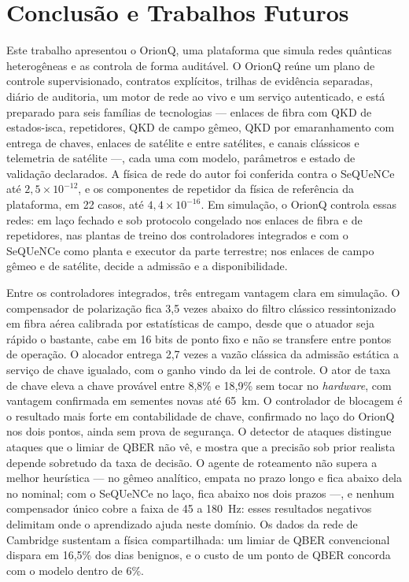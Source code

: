 \documentclass[12pt]{article}
\begin{document}
\section{Conclusão e Trabalhos Futuros}

Este trabalho apresentou o OrionQ, uma plataforma que simula redes quânticas
heterogêneas e as controla de forma auditável. O OrionQ reúne um plano de
controle supervisionado, contratos explícitos, trilhas de evidência separadas,
diário de auditoria, um motor de rede ao vivo e um serviço autenticado, e está
preparado para seis famílias de tecnologias --- enlaces de fibra com QKD de
estados-isca, repetidores, QKD de campo gêmeo, QKD por emaranhamento com entrega
de chaves, enlaces de satélite e entre satélites, e canais clássicos e telemetria
de satélite ---, cada uma com modelo, parâmetros e estado de validação
declarados. A física de rede do autor foi conferida contra o SeQUeNCe até
$2{,}5\times10^{-12}$, e os componentes de repetidor da física de referência da
plataforma, em 22 casos, até $4{,}4\times10^{-16}$. Em simulação, o OrionQ
controla essas redes: em laço fechado e sob protocolo congelado nos enlaces de
fibra e de repetidores, nas plantas de treino dos controladores integrados e com
o SeQUeNCe como planta e executor da parte terrestre; nos enlaces de campo gêmeo
e de satélite, decide a admissão e a disponibilidade.

Entre os controladores integrados, três entregam vantagem clara em simulação. O compensador de
polarização fica 3,5 vezes abaixo do filtro clássico ressintonizado em fibra
aérea calibrada por estatísticas de campo, desde que o atuador seja rápido o
bastante, cabe em 16 bits de ponto fixo e não se transfere entre pontos de
operação. O alocador entrega 2,7 vezes a vazão clássica da admissão estática a
serviço de chave igualado, com o ganho vindo da lei de controle. O ator de taxa
de chave eleva a chave provável entre 8,8\% e 18,9\% sem tocar no
\textit{hardware}, com vantagem confirmada em sementes novas até 65~km. O controlador de blocagem é o resultado mais forte em
contabilidade de chave, confirmado no laço do OrionQ nos dois pontos, ainda sem
prova de segurança. O detector de ataques
distingue ataques que o limiar de QBER não vê, e mostra que a precisão sob prior
realista depende sobretudo da taxa de decisão. O agente de roteamento não supera
a melhor heurística --- no gêmeo analítico, empata no prazo longo e fica abaixo
dela no nominal; com o SeQUeNCe no laço, fica abaixo nos dois prazos ---, e
nenhum compensador único cobre a faixa de 45 a 180~Hz: esses resultados
negativos delimitam onde o aprendizado ajuda neste domínio. Os dados da rede de Cambridge sustentam a física compartilhada: um
limiar de QBER convencional dispara em 16,5\% dos dias benignos, e o custo de um
ponto de QBER concorda com o modelo dentro de 6\%.
\end{document}
